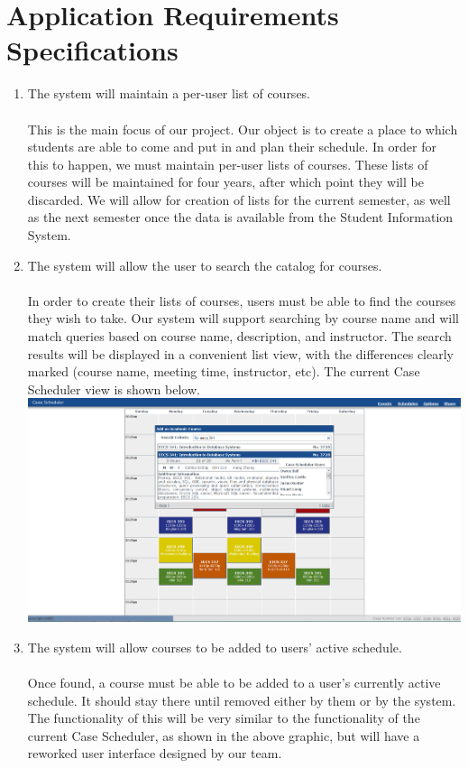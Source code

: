 \documentclass[pdftex,12pt,letter]{article}
\begin{document}
\section{Application Requirements Specifications}
\begin{enumerate}[1.]
\item The system will maintain a per-user list of courses.\\\\
This is the main focus of our project. Our object is to create a place to which students are able to come and put in and plan their schedule. In order for this to happen, we must maintain per-user lists of courses. These lists of courses will be maintained for four years, after which point they will be discarded. We will allow for creation of lists for the current semester, as well as the next semester once the data is available from the Student Information System.
\item The system will allow the user to search the catalog for courses.\\\\
In order to create their lists of courses, users must be able to find the courses they wish to take. Our system will support searching by course name and will match queries based on course name, description, and instructor. The search results will be displayed in a convenient list view, with the differences clearly marked (course name, meeting time, instructor, etc). The current Case Scheduler view is shown below.\\
\includegraphics[width=130mm]{add_course.png}
\item The system will allow courses to be added to users' active schedule.\\\\
Once found, a course must be able to be added to a user's currently active schedule. It should stay there until removed either by them or by the system. The functionality of this will be very similar to the functionality of the current Case Scheduler, as shown in the above graphic, but will have a reworked user interface designed by our team.

\end{enumerate}
\end{document}
